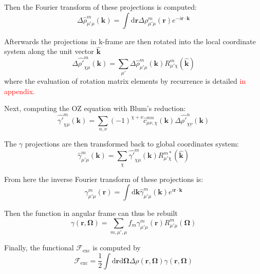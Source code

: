 Then the Fourier transform of these projections is computed:
\begin{equation}
\Delta\hat{\rho}_{\mu'\mu}^{m}(\mathbf{k})=\int\mathrm{d}\mathbf{r}\Delta\rho_{\mu'\mu}^{m}(\mathbf{r})e^{-i\mathbf{r}\cdot\mathbf{k}}\label{eq:fft3d-fwd}
\end{equation}


Afterwards the projections in k-frame are then rotated into the local
coordinate system along the unit vector $\mathbf{\hat{k}}$
\begin{equation}
\Delta\hat{\rho'}_{\chi\mu}^{m}(\mathbf{k})=\sum_{\mu'}\Delta\hat{\rho}_{\mu'\mu}^{m}(\mathbf{k})R_{\mu'\chi}^{m}(\mathbf{\hat{k}})
\end{equation}
where the evaluation of rotation matrix elements by recurrence is
detailed \textcolor{red}{in appendix.}

Next, computing the OZ equation with Blum's reduction:
\begin{equation}
\hat{\gamma'}_{\chi\mu}^{m}(\mathbf{k})=\sum_{n,\nu}(-1)^{\chi+\nu}\hat{c}_{\mu\nu,\chi}^{mn}(\mathbf{k})\Delta\hat{\rho'}_{\chi\underline{\nu}}^{n}(\mathbf{k})\label{eq:OZ-2}
\end{equation}


The $\gamma$ projections are then transformed back to global coordinates
system:
\begin{equation}
\hat{\gamma}_{\mu'\mu}^{m}(\mathbf{k})=\sum_{\chi}\hat{\gamma'}_{\chi\mu}^{m}(\mathbf{k})R_{\mu'\chi}^{m*}(\mathbf{\hat{k}})
\end{equation}


From here the inverse Fourier transform of these projections is:
\begin{equation}
\gamma_{\mu'\mu}^{m}(\mathbf{r})=\int\mathrm{d}\mathbf{k}\hat{\gamma}_{\mu'\mu}^{m}(\mathbf{k})e^{i\mathbf{r}\cdot\mathbf{k}}
\end{equation}


Then the function in angular frame can thus be rebuilt
\begin{equation}
\gamma(\mathbf{r},\mathbf{\Omega})=\sum_{m,\mu',\mu}f_{m}\gamma_{\mu'\mu}^{m}(\mathbf{r})R_{\mu'\mu}^{m}(\mathbf{\Omega})\label{eq:fgsht-bwd}
\end{equation}


Finally, the functional $\mathcal{F}_{\mathrm{exc}}$ is computed
by
\begin{equation}
\mathcal{F}_{\mathrm{exc}}=\frac{1}{2}\int\mathrm{d}\mathbf{r}\mathrm{d}\mathbf{\Omega}\Delta\rho(\mathbf{r},\mathbf{\Omega})\gamma(\mathbf{r},\mathbf{\Omega})
\end{equation}



